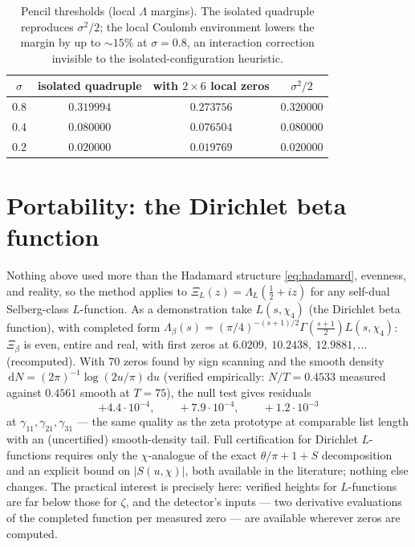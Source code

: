 \documentclass[11pt]{amsart}
\theoremstyle{remark}
\newcommand{\dd}{\,\mathrm{d}}
\begin{document}
\begin{table}[ht]
\centering
\begin{tabular}{cccc}
\toprule
$\sigma$ & isolated quadruple & with $2\times 6$ local zeros & $\sigma^2/2$\\
\midrule
$0.8$ & $0.319994$ & $0.273756$ & $0.320000$\\
$0.4$ & $0.080000$ & $0.076504$ & $0.080000$\\
$0.2$ & $0.020000$ & $0.019769$ & $0.020000$\\
\bottomrule
\end{tabular}
\medskip
\caption{Pencil thresholds (local $\Lambda$ margins). The isolated quadruple reproduces $\sigma^2/2$; the local Coulomb environment lowers the margin by up to $\sim\!15\%$ at $\sigma=0.8$, an interaction correction invisible to the isolated-configuration heuristic.}
\label{tab:margin}
\end{table}

\section{Portability: the Dirichlet beta function}\label{sec:beta}

Nothing above used more than the Hadamard structure \eqref{eq:hadamard}, evenness, and reality, so the method applies to $\Xi_L(z)=\Lambda_L(\tfrac12+iz)$ for any self-dual Selberg-class $L$-function. As a demonstration take $L(s,\chi_4)$ (the Dirichlet beta function), with completed form $\Lambda_\beta(s)=(\pi/4)^{-(s+1)/2}\Gamma(\tfrac{s+1}{2})L(s,\chi_4)$: $\Xi_\beta$ is even, entire and real, with first zeros at $6.0209,\ 10.2438,\ 12.9881,\dots$ (recomputed). With $70$ zeros found by sign scanning and the smooth density $\dd N=(2\pi)^{-1}\log(2u/\pi)\dd u$ (verified empirically: $N/T=0.4533$ measured against $0.4561$ smooth at $T=75$), the null test gives residuals
\[
+4.4\cdot 10^{-4},\qquad +7.9\cdot 10^{-4},\qquad +1.2\cdot 10^{-3}
\]
at $\gamma_{11},\gamma_{21},\gamma_{31}$ --- the same quality as the zeta prototype at comparable list length with an (uncertified) smooth-density tail. Full certification for Dirichlet $L$-functions requires only the $\chi$-analogue of the exact $\theta/\pi+1+S$ decomposition and an explicit bound on $|S(u,\chi)|$, both available in the literature; nothing else changes. The practical interest is precisely here: verified heights for $L$-functions are far below those for $\zeta$, and the detector's inputs --- two derivative evaluations of the completed function per measured zero --- are available wherever zeros are computed.
\end{document}
